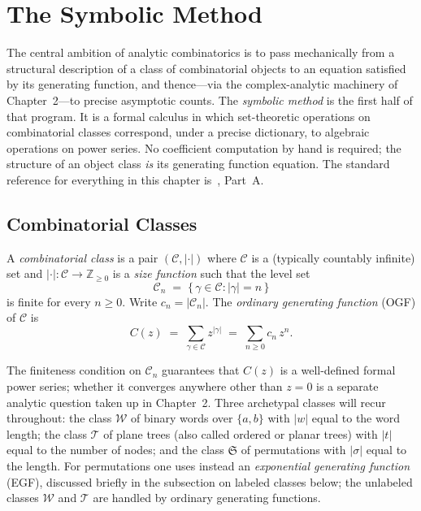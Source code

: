 \chapter{The Symbolic Method}

The central ambition of analytic combinatorics is to pass mechanically from a
structural description of a class of combinatorial objects to an equation satisfied
by its generating function, and thence---via the complex-analytic machinery of
Chapter~2---to precise asymptotic counts.  The \emph{symbolic method} is the first
half of that program.  It is a formal calculus in which set-theoretic operations on
combinatorial classes correspond, under a precise dictionary, to algebraic
operations on power series.  No coefficient computation by hand is required; the
structure of an object class \emph{is} its generating function equation.  The
standard reference for everything in this chapter is~\cite{FlajoletSedgewick2009},
Part~A.

\section{Combinatorial Classes}

\begin{definition}
A \emph{combinatorial class} is a pair $(\mathcal{C}, |\cdot|)$ where
$\mathcal{C}$ is a (typically countably infinite) set and
$|\cdot| : \mathcal{C} \to \mathbb{Z}_{\ge 0}$ is a \emph{size function} such
that the level set
\[
  \mathcal{C}_n \;=\; \{\,\gamma \in \mathcal{C} : |\gamma| = n\,\}
\]
is finite for every $n \ge 0$.  Write $c_n = |\mathcal{C}_n|$.  The
\emph{ordinary generating function} (OGF) of $\mathcal{C}$ is
\[
  C(z) \;=\; \sum_{\gamma \in \mathcal{C}} z^{|\gamma|}
            \;=\; \sum_{n \ge 0} c_n\, z^n.
\]
\end{definition}

The finiteness condition on $\mathcal{C}_n$ guarantees that $C(z)$ is a
well-defined formal power series; whether it converges anywhere other than $z = 0$
is a separate analytic question taken up in Chapter~2.  Three archetypal classes
will recur throughout: the class $\mathcal{W}$ of binary words over $\{a,b\}$
with $|w|$ equal to the word length; the class $\mathcal{T}$ of plane trees (also
called ordered or planar trees) with $|t|$ equal to the number of nodes; and the
class $\mathfrak{S}$ of permutations with $|\sigma|$ equal to the length.  For
permutations one uses instead an \emph{exponential generating function} (EGF),
discussed briefly in the subsection on labeled classes below; the unlabeled classes $\mathcal{W}$ and
$\mathcal{T}$ are handled by ordinary generating functions.

